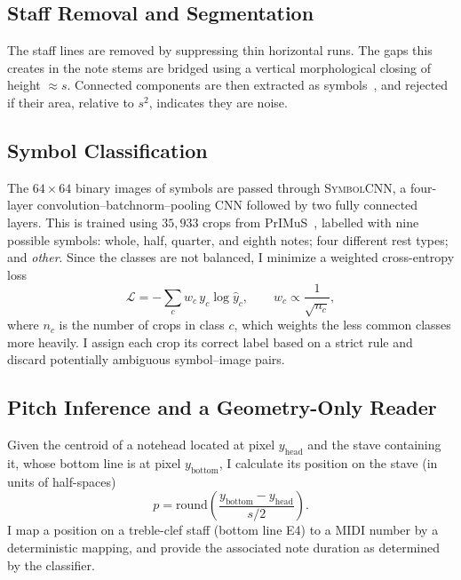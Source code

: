 \subsection{Staff Removal and Segmentation}
\label{sec:method:segment}
The staff lines are removed by suppressing thin horizontal runs. The gaps this
creates in the note stems are bridged using a vertical morphological closing of
height $\approx s$. Connected components are then extracted as
symbols~\cite{suzuki1985contours}, and rejected if their area, relative to $s^2$,
indicates they are noise.

\subsection{Symbol Classification}
\label{sec:method:cnn}
The $64\times64$ binary images of symbols are passed through \textsc{SymbolCNN},
a four-layer convolution--batchnorm--pooling CNN followed by two fully connected
layers. This is trained using $35{,}933$ crops from PrIMuS~\cite{calvo2018primus},
labelled with nine possible symbols: whole, half, quarter, and eighth notes; four
different rest types; and \emph{other}. Since the classes are not balanced, I
minimize a weighted cross-entropy loss
\begin{equation}
  \mathcal{L} = -\sum_{c} w_c\, y_c \log \hat{y}_c,
  \qquad
  w_c \propto \frac{1}{\sqrt{n_c}},
  \label{eq:wce}
\end{equation}
where $n_c$ is the number of crops in class $c$, which weights the less common
classes more heavily. I assign each crop its correct label based on a strict rule
and discard potentially ambiguous symbol--image pairs.

\subsection{Pitch Inference and a Geometry-Only Reader}
\label{sec:method:pitch}
Given the centroid of a notehead located at pixel $y_{\text{head}}$ and the stave
containing it, whose bottom line is at pixel $y_{\text{bottom}}$, I calculate its
position on the stave (in units of half-spaces)
\begin{equation}
  p = \mathrm{round}\!\left(\frac{y_{\text{bottom}}-y_{\text{head}}}{s/2}\right).
  \label{eq:staffpos}
\end{equation}
I map a position on a treble-clef staff (bottom line E4) to a MIDI number by a
deterministic mapping, and provide the associated note duration as determined by
the classifier.

